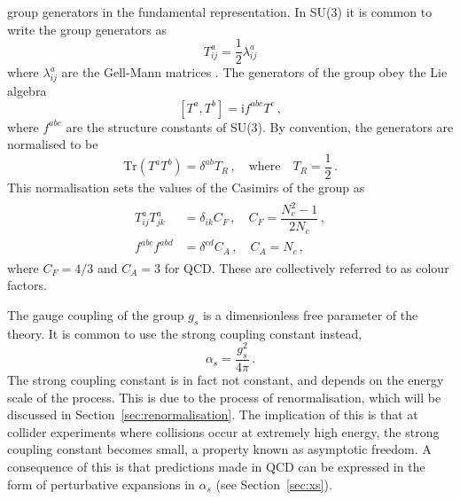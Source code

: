 \documentclass[main.tex]{subfiles}
\begin{document}
    group generators in the fundamental representation. In SU(3) it is
    common to write the group generators as
    \begin{equation}\label{eqn:group_generators}
        T^{a}_{ij} = \dfrac{1}{2}\lambda^{a}_{ij}
    \end{equation}
    where $\lambda^{a}_{ij}$ are the Gell-Mann matrices \cite{Gell-Mann:1962yej}.
    The generators of the group obey the Lie algebra
    \begin{equation}\label{eqn:lie_algebra}
        [T^{a}, T^{b}] = \mathrm{i}f^{abc}T^{c} \, ,
    \end{equation}
    where $f^{abc}$ are the structure constants of SU(3).
    By convention, the generators are normalised to be
    \begin{equation}\label{eqn:generator_normalisation}
        \mathrm{Tr}(T^{a}T^{b}) = \delta^{ab}T_{R} \, , \quad \mathrm{where} \quad T_{R} = \dfrac{1}{2} \, .
    \end{equation}
    This normalisation sets the values of the Casimirs
    of the group as
    \begin{align}\label{eqn:casimirs}
        \begin{split}
            T^{a}_{ij}T^{a}_{jk} &= \delta_{ik}C_{F} \, , \quad C_{F} = \dfrac{N_{c}^2-1}{2N_{c}} \, , \\
            f^{abc}f^{abd} &= \delta^{cd}C_{A} \, , \quad C_{A} = N_{c} \, ,
        \end{split}
    \end{align}
    where $C_{F}=4/3$ and $C_{A}=3$ for QCD.
    These are collectively referred to as colour factors.

    The gauge coupling of the group $g_{s}$
    is a dimensionless free parameter of the theory.
    It is common to use the strong coupling constant
    instead, 
    \begin{equation}\label{eqn:alpha_s}
        \alpha_{s} = \dfrac{g_{s}^{2}}{4\pi} \, .
    \end{equation}
    The strong coupling constant is in fact not constant, and
    depends on the energy scale of the process. This
    is due to the process of renormalisation, which will be discussed
    in Section~\ref{sec:renormalisation}.
    The implication of this is that at collider
    experiments where collisions occur at extremely high energy,
    the strong coupling constant becomes small, a
    property known as asymptotic freedom. A consequence
    of this is that predictions made in QCD can be expressed
    in the form of perturbative expansions in $\alpha_{s}$ (see Section~\ref{sec:xs}).
\end{document}
